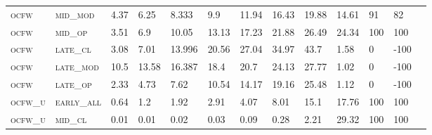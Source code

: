 \begin{landscape}
\begin{table}[!htbp]
\begin{tabular}{@{}lllllllllllll@{}}
\footnotesize \textsc{ocfw}        & \footnotesize \textsc{mid\_mod  }                & \footnotesize 4.37          & \footnotesize 6.25           & \footnotesize 8.333            & \footnotesize 9.9             & \footnotesize 11.94           & \footnotesize 16.43           & \footnotesize 19.88      & \footnotesize 14.61    & \footnotesize 91     & \footnotesize 82    \\
\footnotesize \textsc{ocfw}        & \footnotesize \textsc{mid\_op   }                & \footnotesize 3.51          & \footnotesize 6.9            & \footnotesize 10.05            & \footnotesize 13.13           & \footnotesize 17.23           & \footnotesize 21.88           & \footnotesize 26.49      & \footnotesize 24.34    & \footnotesize 100    & \footnotesize 100    \\
\footnotesize \textsc{ocfw}        & \footnotesize \textsc{late\_cl  }                & \footnotesize 3.08          & \footnotesize 7.01           & \footnotesize 13.996           & \footnotesize 20.56           & \footnotesize 27.04           & \footnotesize 34.97           & \footnotesize 43.7       & \footnotesize 1.58     & \footnotesize 0      & \footnotesize -100    \\
\footnotesize \textsc{ocfw}        & \footnotesize \textsc{late\_mod }                & \footnotesize 10.5          & \footnotesize 13.58          & \footnotesize 16.387           & \footnotesize 18.4            & \footnotesize 20.7            & \footnotesize 24.13           & \footnotesize 27.77      & \footnotesize 1.02     & \footnotesize 0      & \footnotesize -100    \\
\footnotesize \textsc{ocfw}        & \footnotesize \textsc{late\_op  }                & \footnotesize 2.33          & \footnotesize 4.73           & \footnotesize 7.62             & \footnotesize 10.54           & \footnotesize 14.17           & \footnotesize 19.16           & \footnotesize 25.48      & \footnotesize 1.12     & \footnotesize 0      & \footnotesize -100    \\
\footnotesize \textsc{ocfw\_u}     & \footnotesize \textsc{early\_all}                & \footnotesize 0.64          & \footnotesize 1.2            & \footnotesize 1.92             & \footnotesize 2.91            & \footnotesize 4.07            & \footnotesize 8.01            & \footnotesize 15.1       & \footnotesize 17.76    & \footnotesize 100    & \footnotesize 100    \\
\footnotesize \textsc{ocfw\_u}     & \footnotesize \textsc{mid\_cl   }                & \footnotesize 0.01          & \footnotesize 0.01           & \footnotesize 0.02             & \footnotesize 0.03            & \footnotesize 0.09            & \footnotesize 0.28            & \footnotesize 2.21       & \footnotesize 29.32    & \footnotesize 100    & \footnotesize 100    \\

\end{tabular}
\end{table}
\end{landscape}
